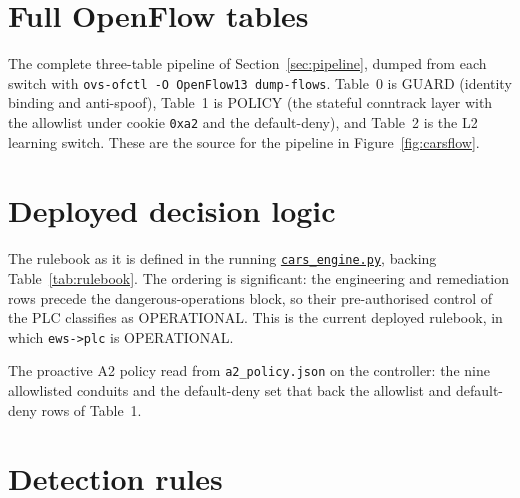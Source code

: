 \FloatBarrier
\section{Full OpenFlow tables}
\label{appx:flows}

The complete three-table pipeline of Section~\ref{sec:pipeline}, dumped from each switch with \texttt{ovs-ofctl -O OpenFlow13 dump-flows}. Table~0 is GUARD (identity binding and anti-spoof), Table~1 is POLICY (the stateful conntrack layer with the allowlist under cookie \texttt{0xa2} and the default-deny), and Table~2 is the L2 learning switch. These are the source for the pipeline in Figure~\ref{fig:carsflow}.





\FloatBarrier
\section{Deployed decision logic}
\label{appx:logic}

The rulebook as it is defined in the running \href{\repourl/blob/main/06_Build/cars_engine.py}{\texttt{cars\_engine.py}}, backing Table~\ref{tab:rulebook}. The ordering is significant: the engineering and remediation rows precede the dangerous-operations block, so their pre-authorised control of the PLC classifies as OPERATIONAL. This is the current deployed rulebook, in which \texttt{ews->plc} is OPERATIONAL.



The proactive A2 policy read from \texttt{a2\_policy.json} on the controller: the nine allowlisted conduits and the default-deny set that back the allowlist and default-deny rows of Table~1.



\FloatBarrier
\section{Detection rules}
\label{appx:snort}

